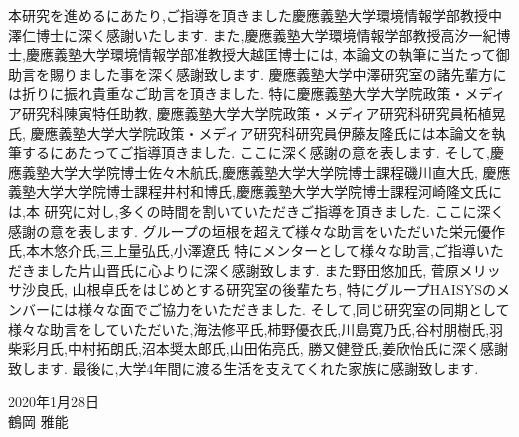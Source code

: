 \begin{acknowledgment}
本研究を進めるにあたり,ご指導を頂きました慶應義塾大学環境情報学部教授中澤仁博士に深く感謝いたします.
また,慶應義塾大学環境情報学部教授高汐一紀博士,慶應義塾大学環境情報学部准教授大越匡博士には,
本論文の執筆に当たって御助言を賜りました事を深く感謝致します.
慶應義塾大学中澤研究室の諸先輩方には折りに振れ貴重なご助言を頂きました.
特に慶應義塾大学大学院政策・メディア研究科陳寅特任助教, 慶應義塾大学大学院政策・メディア研究科研究員柘植晃氏,
慶應義塾大学大学院政策・メディア研究科研究員伊藤友隆氏には本論文を執筆するにあたってご指導頂きました.
ここに深く感謝の意を表します.
そして,慶應義塾大学大学院博士佐々木航氏,慶應義塾大学大学院博士課程磯川直大氏,
慶應義塾大学大学院博士課程井村和博氏,慶應義塾大学大学院博士課程河崎隆文氏には,本
研究に対し,多くの時間を割いていただきご指導を頂きました.
ここに深く感謝の意を表します.
グループの垣根を超えて゚様々な助言をいただいた栄元優作氏,本木悠介氏,三上量弘氏,小澤遼氏
特にメンターとして様々な助言,ご指導いただきました片山晋氏に心よりに深く感謝致します.
また野田悠加氏, 菅原メリッサ沙良氏, 山根卓氏をはじめとする研究室の後輩たち, 特にグループHAISYSのメンバーには様々な面でご協力をいただきました.
そして,同じ研究室の同期として様々な助言をしていただいた,海法修平氏,柿野優衣氏,川島寛乃氏,谷村朋樹氏,羽柴彩月氏,中村拓朗氏,沼本奨太郎氏,山田佑亮氏,
勝又健登氏,姜欣怡氏に深く感謝致します.
最後に,大学4年間に渡る生活を支えてくれた家族に感謝致します.\\
\begin{flushright}
2020年1月28日\\
鶴岡 雅能
\end{flushright}

\end{acknowledgment}
